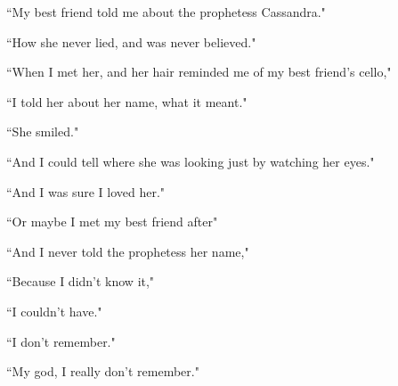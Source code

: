 \documentclass[11pt]{article}
\begin{document}
\vspace*{4\baselineskip}

\begingroup
\begin{center}
``My best friend told me about the prophetess Cassandra."
\end{center}
\endgroup

\begingroup
\begin{center}
``How she never lied, and was never believed."
\end{center}
\endgroup

\begingroup
\begin{center}
``When I met her, and her hair reminded me of my best friend's cello,"
\end{center}
\endgroup

\begingroup
\begin{center}
``I told her about her name, what it meant."
\end{center}
\endgroup

\begingroup
\begin{center}
``She smiled."
\end{center}
\endgroup

\begingroup
\begin{center}
``And I could tell where she was looking just by watching her eyes."
\end{center}
\endgroup

\begingroup
\begin{center}
``And I was sure I loved her."
\end{center}
\endgroup

\begingroup
\begin{center}
``Or maybe I met my best friend after"
\end{center}
\endgroup

\begingroup
\begin{center}
``And I never told the prophetess her name,"
\end{center}
\endgroup

\begingroup
\begin{center}
``Because I didn't know it,"
\end{center}
\endgroup

\begingroup
\begin{center}
``I couldn't have."
\end{center}
\endgroup

\begingroup
\begin{center}
``I don't remember."
\end{center}
\endgroup

\begingroup
\begin{center}
``My god, I really don't remember."
\end{center}
\endgroup
\end{document}

